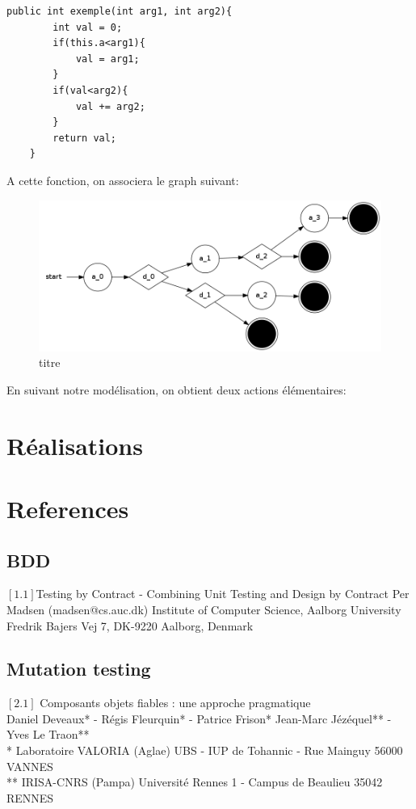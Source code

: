 \documentclass[a4paper]{report}
\begin{document}
\begin{lstlisting}
public int exemple(int arg1, int arg2){
		int val = 0;
		if(this.a<arg1){
			val = arg1;
		}
		if(val<arg2){
			val += arg2;
		}
		return val;
	}
\end{lstlisting}
A cette fonction, on associera le graph suivant:\\


\begin{figure}[h!]
   \caption{\label{étiquette} titre}
   \includegraphics[scale=0.3]{../graphviz/doubleStackGraph.png}
\end{figure}



En suivant notre modélisation, on obtient deux actions élémentaires:


\chapter*{Réalisations}


\chapter*{References}
\section*{BDD}
$[1.1]$Testing by Contract
- Combining Unit Testing and Design by Contract
Per Madsen (madsen@cs.auc.dk)
Institute of Computer Science, Aalborg University
Fredrik Bajers Vej 7, DK-9220 Aalborg, Denmark\\
\newline



\section*{Mutation testing}
$[2.1]$ Composants objets fiables :
une approche pragmatique\\
Daniel Deveaux* - Régis Fleurquin* - Patrice Frison*
Jean-Marc Jézéquel** - Yves Le Traon**\\
* Laboratoire VALORIA (Aglae)
UBS - IUP de Tohannic - Rue Mainguy
56000 VANNES\\
** IRISA-CNRS (Pampa)
Université Rennes 1 - Campus de Beaulieu
35042 RENNES\\
\newline
\end{document}
